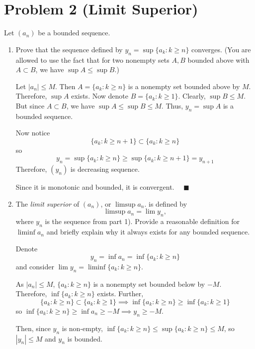 \documentclass[12pt]{article}
\newcommand{\qed}{\quad \blacksquare}
\newcommand{\abs}[1]{\left\vert #1 \right\vert}
\begin{document}
\section{Problem 2 (Limit Superior)}
Let $(a_n)$ be a bounded sequence.
\begin{enumerate}
	\item Prove that the sequence defined by $y_n=\sup\{a_k:k\geq n \}$ converges. (You are allowed to use the fact that for two nonempty sets $A,B$ bounded above with $A\subset B$, we have $\sup A\leq \sup B$.)
    
        \color{blue}
            Let $\abs{a_n} \leq M$. Then $A = \{a_k: k \geq n\}$ is a nonempty set bounded above by $M$. Therefore, $\sup A$ exists. Now denote $B = \{a_k: k \geq 1\}$. Clearly, $\sup B \leq M$. But since $A \subset B$, we have $\sup A \leq \sup B \leq M$. Thus, $y_n = \sup A$ is a bounded sequence.

            Now notice 
            \[\{a_k : k \geq n+1\} \subset \{a_k: k \geq n\}\]
            so 
            \[y_n = \sup\{a_k: k \geq n\} \geq \sup\{a_k: k \geq n+1\} = y_{n+1}\]
            Therefore, $(y_n)$ is decreasing sequence.

            Since it is monotonic and bounded, it is convergent. $\qed$ 
        \color{black}

	\item The \textit{limit superior} of $(a_n)$, or $\limsup a_n$. is defined by
	\begin{equation*}
		\limsup a_n=\lim y_n,
	\end{equation*}
	where $y_n$ is the sequence from part 1). Provide a reasonable definition for $\liminf a_n$ and briefly explain why it always exists for any bounded sequence.

        \color{blue}
            Denote
            \[y_n = \inf a_n = \inf\{a_k: k \geq n\}\]
            and consider $\lim y_n = \liminf \{a_k: k \geq n\}$.

            As $\abs{a_n} \leq M$, $\{a_k: k \geq n\}$ is a nonempty set bounded below by $-M$. Therefore, $\inf\{a_k: k \geq n\}$ exists. Further, 
            \[\{a_k: k \geq n\} \subset \{a_k: k \geq 1\} \implies \inf \{a_k: k \geq n\} \geq \inf\{a_k: k \geq 1\}\]
            so $\inf\{a_k : k \geq n\} \geq \inf a_n \geq -M \implies y_n \geq -M$.

            Then, since $y_n$ is non-empty, $\inf\{a_k: k\geq n\} \leq \sup \{a_k: k \geq n\} \leq M$, so $\abs{y_n} \leq M$ and $y_n$ is bounded.


\end{enumerate}
\end{document}
